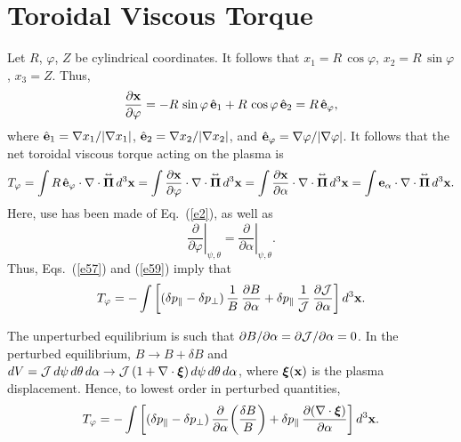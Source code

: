 \documentclass[12pt,prb,aps,notitlepage]{revtex4-1}
\newcommand{\bxi}{\mbox{\boldmath$\xi$}}
\newcommand{\bPi}{\mbox{\boldmath$\Pi$}}
\newcommand{\smalltensor}[1]{\overset{\text{\tiny$\leftrightarrow$}}{#1}}
\begin{document}
\section{Toroidal Viscous Torque}
 Let $R$, $\varphi$, $Z$ be cylindrical coordinates. It follows that $x_1=R\,\cos\varphi$, $x_2=R\,\sin\varphi$, $x_3=Z$. Thus,
 \begin{equation}
 \frac{\partial {\bf x}}{\partial\varphi} = -R\,\sin\varphi\,\hat{\bf e}_1+R\,\cos\varphi\,\hat{\bf e}_2= R\,\hat{\bf e}_\varphi,
 \end{equation}
 where $\hat{\bf e}_1=\nabla x_1/|\nabla x_1|$, $\hat{\bf e}_2=\nabla x_2/|\nabla x_2|$, and $\hat{\bf e}_\varphi=\nabla \varphi/|\nabla \varphi|$. 
 It follows that the net toroidal viscous torque acting on the plasma is
 \begin{equation}\label{e59}
 T_\varphi = \int  R\,\hat{\bf e}_\varphi \cdot\nabla\cdot \smalltensor{\bPi}\,d^3{\bf x}= \int  \frac{\partial {\bf x}}{\partial\varphi} \cdot\nabla\cdot \smalltensor{\bPi}\,d^3{\bf x}= \int  \frac{\partial {\bf x}}{\partial\alpha} \cdot\nabla\cdot \smalltensor{\bPi}\,d^3{\bf x} = \int  {\bf e}_\alpha \cdot\nabla\cdot \smalltensor{\bPi}\,d^3{\bf x}.
 \end{equation}
 Here, use has been made of Eq.~(\ref{e2}), as well as 
 \begin{equation}
 \left.\frac{\partial}{\partial\varphi}\right|_{\psi,\theta} = \left.\frac{\partial}{\partial\alpha}\right|_{\psi,\theta}.
 \end{equation}
 Thus, Eqs.~(\ref{e57}) and (\ref{e59}) imply that
 \begin{equation}
 T_\varphi = -\int \left[(\delta p_\parallel-\delta p_\perp)\,\frac{1}{B}\,\frac{\partial B}{\partial \alpha}+\delta p_\parallel\,\frac{1}{{\cal J}}\,\frac{\partial{\cal J}}{\partial \alpha}\right]d^3{\bf x}.
 \end{equation}
 
 The unperturbed equilibrium is such that $\partial B/\partial \alpha =\partial{\cal J}/\partial\alpha=0$. In the perturbed equilibrium, 
 $B\rightarrow B+\delta B$ and 
 $dV= {\cal J}\,d\psi\,d\theta\,d\alpha\rightarrow {\cal J}\,(1+\nabla\cdot\bxi)\,d\psi\,d\theta\,d\alpha$, where $\bxi({\bf x})$ is the plasma displacement. Hence,
 to lowest order in perturbed quantities, 
 \begin{equation}\label{e62}
 T_\varphi = -\int \left[(\delta p_\parallel-\delta p_\perp)\,\frac{\partial}{\partial \alpha}\!\left(\frac{\delta B}{B}\right)+\delta p_\parallel\,\frac{\partial(\nabla\cdot\bxi)}{\partial \alpha}\right]d^3{\bf x}.
 \end{equation}
 
\end{document}

